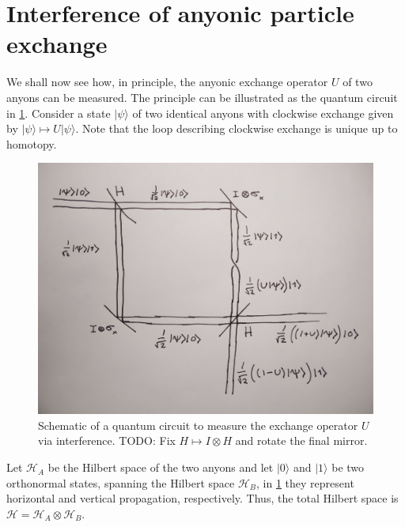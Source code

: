 \section{Interference of anyonic particle exchange}

We shall now see how, in principle, the anyonic exchange operator $U$ of two anyons can be measured. The principle can be illustrated as the quantum circuit in \cref{fig:exchange interference}. Consider a state $|ψ⟩$ of two identical anyons with clockwise exchange given by $|ψ⟩ ↦ U|ψ⟩$. Note that the loop describing clockwise exchange is unique up to homotopy.

\begin{figure}
  \centering
  \includegraphics[width=\textwidth]{img/exchange-interference.jpg}
  \caption{Schematic of a quantum circuit to measure the exchange operator $U$ via interference. TODO: Fix $H ↦ I⊗H$ and rotate the final mirror.}
  \label{fig:exchange interference}
\end{figure}

Let $\mathcal{H}_A$ be the Hilbert space of the two anyons and let $|0⟩$ and $|1⟩$ be two orthonormal states, spanning the Hilbert space $\mathcal{H}_B$, in \cref{fig:exchange interference} they represent horizontal and vertical propagation, respectively. Thus, the total Hilbert space is $\mathcal{H} = \mathcal{H}_A⊗\mathcal{H}_B$.

